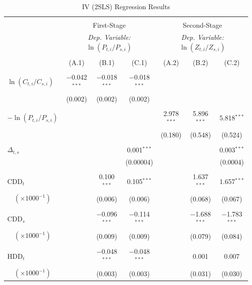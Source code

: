 \documentclass[11pt,a4paper,leqno]{extarticle}
\begin{document}
	
	\begin{table}[!h] 
		\centering 
		\caption{IV (2SLS) Regression Results}
		\label{table:iv} 
		\small
		\begin{tabular}{@{\extracolsep{4pt}}lcccccc} 
			\\[-4ex]\hline  
			\hline \\[-1.6ex] 
			& \multicolumn{3}{c}{First-Stage} & \multicolumn{3}{c}{Second-Stage} \\ [0.5ex]
			& \multicolumn{3}{c}{\textit{Dep. Variable:} $\ln (P_{t,i} / P_{s,i})$ } & \multicolumn{3}{c}{\textit{Dep. Variable:}  $\ln (Z_{ t, i} / Z_{ s, i})$}\\ [0.5ex]
			\cmidrule(lr){2-4} \cmidrule(lr){5-7}\\[-2.2ex] 
			& (A.1) & (B.1) & (C.1) & (A.2) & (B.2) & (C.2)\\ [0.5ex]
			\hline \\[-1.8ex] 
			$ \ln (C_{t,i} / C_{s,i})$ & $-$0.042$^{***}$ & $-$0.018$^{***}$ & $-$0.018$^{***}$ &  &  &  \\ 
			& (0.002) & (0.002) & (0.002) &  &  &  \\ 
			& & & & & & \\ 
			$-\ln (P_{t,i} / P_{s,i})$ &  &  &  & 2.978$^{***}$ & 5.896$^{***}$ & 5.818$^{***}$ \\ 
			&  &  &  & (0.180) & (0.548) & (0.524) \\ 
			& & & & & & \\ 
			$\Delta_{t,s}$  &  &  & 0.001$^{***}$ &  &  & 0.003$^{***}$ \\ 
			&  &  & (0.00004) &  &  & (0.0004) \\ 
			& & & & & & \\ 
			CDD$_t$  &  & 0.100$^{***}$ & 0.105$^{***}$ &  & 1.637$^{***}$ & 1.657$^{***}$ \\ 
			$\quad(\times 1000^{-1})$ &  & (0.006) & (0.006) &  & (0.068) & (0.067) \\ 
			& & & & & & \\ 
			CDD$_s$ &  & $-$0.096$^{***}$ & $-$0.114$^{***}$ &  & $-$1.688$^{***}$ & $-$1.783$^{***}$ \\ 
			$\quad(\times 1000^{-1})$  &  & (0.009) & (0.009) &  & (0.079) & (0.084) \\ 
			& & & & & & \\ 
			HDD$_t$  &  & $-$0.048$^{***}$ & $-$0.048$^{***}$ &  & 0.001 & 0.007 \\ 
			$\quad(\times 1000^{-1})$ &  & (0.003) & (0.003) &  & (0.031) & (0.030) \\ 

\end{tabular}
\end{table}
\end{document}
